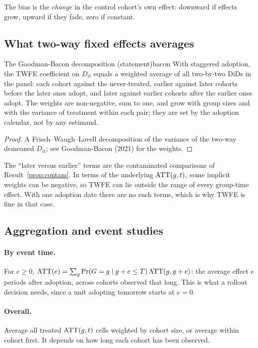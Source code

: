 \documentclass[11pt]{article}
\begin{document}
The bias is the \emph{change} in the control cohort's own effect: downward if effects grow, upward if they fade, zero if constant.

\subsection{What two-way fixed effects averages}

\begin{prop}{The Goodman-Bacon decomposition (statement)}{bacon}
With staggered adoption, the TWFE coefficient on $D_{it}$ equals a weighted average of all two-by-two DiDs in the panel: each cohort against the
never-treated, earlier against later cohorts before the later ones adopt, and later against earlier cohorts after the earlier ones adopt. The weights are
non-negative, sum to one, and grow with group sizes and with the variance of treatment within each pair; they are set by the adoption calendar, not by
any estimand.
\end{prop}
\begin{proof}
A Frisch--Waugh--Lovell decomposition of the variance of the two-way demeaned $D_{it}$; see Goodman-Bacon (2021) for the weights.
\end{proof}

The ``later versus earlier'' terms are the contaminated comparisons of Result~\ref{prop:contam}. In terms of the underlying $\text{ATT}(g,t)$, some implicit weights
can be negative, so TWFE can lie outside the range of every group-time effect. With one adoption date there are no such terms, which is why TWFE is fine in
that case.

\subsection{Aggregation and event studies}

\paragraph{By event time.} For $e \ge 0$, $\text{ATT}(e) = \sum_g \Pr(G = g \mid g + e \le T)\,\text{ATT}(g, g+e)$: the average effect $e$ periods after adoption, across
cohorts observed that long. This is what a rollout decision needs, since a unit adopting tomorrow starts at $e = 0$.

\paragraph{Overall.} Average all treated $\text{ATT}(g,t)$ cells weighted by cohort size, or average within cohort first. It depends on how long each cohort has been
observed.
\end{document}
